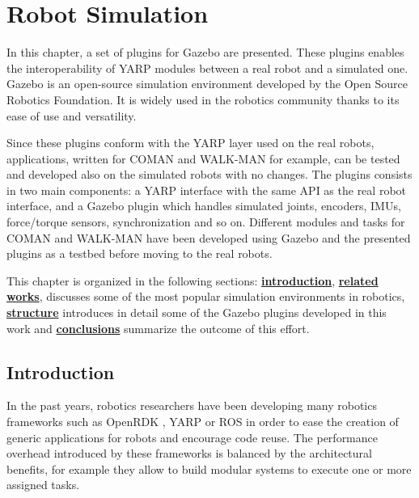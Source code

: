 %
\chapter{Robot Simulation}
\label{sec:robotics-simulation}

\let\thefootnote\relax{}


In this chapter, a set of plugins for Gazebo are presented. These plugins enables the interoperability of YARP modules between a real robot and a simulated one. Gazebo is an open-source simulation environment developed by the Open Source Robotics Foundation. It is widely used in the robotics community thanks to its ease of use and versatility.

Since these plugins conform with the YARP layer used on the real robots, applications, written for COMAN and WALK-MAN for example, can be tested and developed also on the simulated robots with no changes. The plugins consists in two main components: a YARP interface with the same API as the real robot interface, and a Gazebo plugin which handles simulated joints, encoders, IMUs, force/torque sensors, synchronization and so on.
Different modules and tasks for COMAN and WALK-MAN have been developed using Gazebo and the presented plugins as a testbed before moving to the real robots.

This chapter is organized in the following sections: \hyperref[sec:robotics-simulation:introduction]{\textbf{introduction}}, \hyperref[sec:robotics-simulation:related-works]{\textbf{related works}}, discusses some of the most popular simulation environments in robotics, \hyperref[sec:robotics-simulation:structure]{\textbf{structure}} introduces in detail some of the Gazebo plugins developed in this work and \hyperref[sec:robotics-simulation:conclusions]{\textbf{conclusions}} summarize the outcome of this effort.

\section{Introduction}
\label{sec:robotics-simulation:introduction}
In the past years, robotics researchers have been developing many robotics frameworks such as OpenRDK \cite{Calisi:08}, YARP \cite{Metta:YARP:2006} or ROS \cite{Quigley:09} in order to ease the creation of generic applications for robots and encourage code reuse. The performance overhead introduced by these frameworks is balanced by the architectural benefits, for example they allow to build modular systems to execute one or more assigned tasks.

